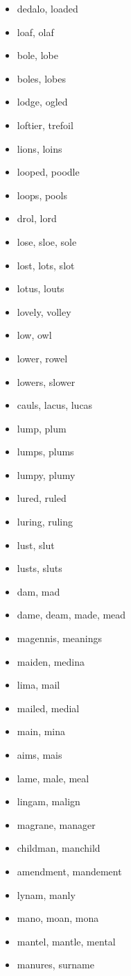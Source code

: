 \documentclass[a4wide,11pt]{report}
\begin{document}
\begin{itemize}
  \item dedalo, loaded
  \item loaf, olaf
  \item bole, lobe
  \item boles, lobes
  \item lodge, ogled
  \item loftier, trefoil
  \item lions, loins
  \item looped, poodle
  \item loops, pools
  \item drol, lord
  \item lose, sloe, sole
  \item lost, lots, slot
  \item lotus, louts
  \item lovely, volley
  \item low, owl
  \item lower, rowel
  \item lowers, slower
  \item cauls, lacus, lucas
  \item lump, plum
  \item lumps, plums
  \item lumpy, plumy
  \item lured, ruled
  \item luring, ruling
  \item lust, slut
  \item lusts, sluts
  \item dam, mad
  \item dame, deam, made, mead
  \item magennis, meanings
  \item maiden, medina
  \item lima, mail
  \item mailed, medial
  \item main, mina
  \item aims, mais
  \item lame, male, meal
  \item lingam, malign
  \item magrane, manager
  \item childman, manchild
  \item amendment, mandement
  \item lynam, manly
  \item mano, moan, mona
  \item mantel, mantle, mental
  \item manures, surname

\end{itemize}
\end{document}
